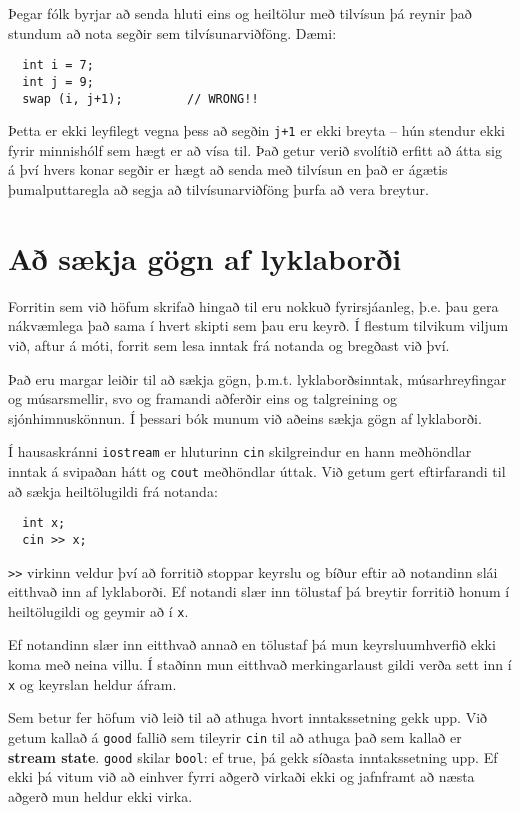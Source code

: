 Þegar fólk byrjar að senda hluti eins og heiltölur með tilvísun þá reynir það stundum að nota segðir sem tilvísunarviðföng.
Dæmi:

\begin{verbatim}
  int i = 7;
  int j = 9;
  swap (i, j+1);         // WRONG!!
\end{verbatim}
%
Þetta er ekki leyfilegt vegna þess að segðin {\tt j+1} er ekki breyta -- hún stendur ekki fyrir minnishólf sem hægt er að vísa til.
Það getur verið svolítið erfitt að átta sig á því hvers konar segðir er hægt að senda með tilvísun en það er ágætis þumalputtaregla að segja að tilvísunarviðföng þurfa að vera breytur.

\section{Að sækja gögn af lyklaborði}
\label{input}

Forritin sem við höfum skrifað hingað til eru nokkuð fyrirsjáanleg, þ.e. þau gera nákvæmlega það sama í hvert skipti sem þau eru keyrð.
Í flestum tilvikum viljum við, aftur á móti, forrit sem lesa inntak frá notanda og bregðast við því.

Það eru margar leiðir til að sækja gögn, þ.m.t. lyklaborðsinntak, músarhreyfingar og músarsmellir, svo og framandi aðferðir eins og talgreining og sjónhimnuskönnun.
Í þessari bók munum við aðeins sækja gögn af lyklaborði.


Í hausaskránni {\tt iostream} er hluturinn {\tt cin} skilgreindur en hann meðhöndlar inntak á svipaðan hátt og {\tt cout} meðhöndlar úttak.
Við getum gert eftirfarandi til að sækja heiltölugildi frá notanda:

\begin{verbatim}
  int x;
  cin >> x;
\end{verbatim}
%
{\tt >>} virkinn veldur því að forritið stoppar keyrslu og bíður eftir að notandinn slái eitthvað inn af lyklaborði.
Ef notandi slær inn tölustaf þá breytir forritið honum í heiltölugildi og geymir að í {\tt x}.


Ef notandinn slær inn eitthvað annað en tölustaf þá mun keyrsluumhverfið ekki koma með neina villu.
Í staðinn mun eitthvað merkingarlaust gildi verða sett inn í {\tt x} og keyrslan heldur áfram.

Sem betur fer höfum við leið til að athuga hvort inntakssetning gekk upp.
Við getum kallað á {\tt good} fallið sem tileyrir {\tt cin} til að athuga það sem kallað er {\bf stream state}.
{\tt good} skilar {\tt bool}: ef true, þá gekk síðasta inntakssetning upp.
Ef ekki þá vitum við að einhver fyrri aðgerð virkaði ekki og jafnframt að næsta aðgerð mun heldur ekki virka.

